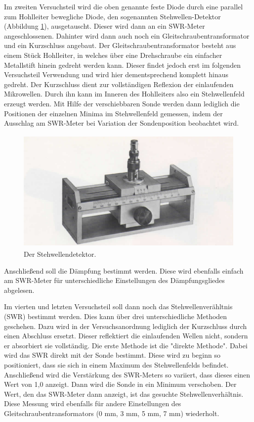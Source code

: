 Im zweiten Versuchsteil wird die oben genannte feste Diode durch eine parallel
zum Hohlleiter bewegliche Diode, den sogenannten Stehwellen-Detektor (Abbildung \ref{fig:stehwellendetektor}), ausgetauscht. Dieser wird dann an ein SWR-Meter angeschlossenen.
Dahinter wird dann auch noch ein Gleitschraubentransformator und ein Kurzschluss angebaut.
Der Gleitschraubentransformator besteht aus einem Stück Hohlleiter, in welches über eine Drehschraube ein einfacher
Metallstift hinein gedreht werden kann. Dieser findet jedoch erst im folgenden Versuchsteil
Verwendung und wird hier dementsprechend komplett hinaus gedreht. Der Kurzschluss
dient zur vollständigen Reflexion der einlaufenden Mikrowellen. Durch ihn kann
im Inneren des Hohlleiters also ein Stehwellenfeld erzeugt werden. Mit Hilfe der
verschiebbaren Sonde werden dann lediglich die Positionen der einzelnen Minima
im Stehwellenfeld gemessen, indem der Ausschlag am SWR-Meter bei Variation der
Sondenposition beobachtet wird.

\begin{figure}[H]
  \centering
  \includegraphics[height=6cm]{Stehwellendetektor.PNG}
  \caption{Der Stehwellendetektor. \cite{sample1}}
  \label{fig:stehwellendetektor}
\end{figure}

Anschließend soll die Dämpfung bestimmt werden. Diese wird ebenfalls einfach am
SWR-Meter für unterschiedliche Einstellungen des Dämpfungsgliedes abgelesen.

Im vierten und letzten Versuchsteil soll dann noch das Stehwellenverähltnis (SWR) bestimmt werden.
Dies kann über drei unterschiedliche Methoden geschehen.
Dazu wird in der Versuchsanordnung lediglich der Kurzschluss durch einen Abschluss ersetzt.
Dieser reflektiert die einlaufenden Wellen nicht, sondern er absorbiert sie vollständig.
Die erste Methode ist die "direkte Methode". Dabei wird das SWR direkt mit der
Sonde bestimmt. Diese wird zu beginn so positioniert, dass sie sich in einem
Maximum des Stehwellenfelds befindet. Anschließend wird die Verstärkung des SWR-Meters
so variiert, dass dieses einen Wert von 1,0 anzeigt. Dann wird die Sonde in ein Minimum
verschoben. Der Wert, den das SWR-Meter dann anzeigt, ist das gesuchte Stehwellenverhältnis.
Diese Messung wird ebenfalls für andere Einstellungen des Gleitschraubentransformators
(0 mm, 3 mm, 5 mm, 7 mm) wiederholt.

